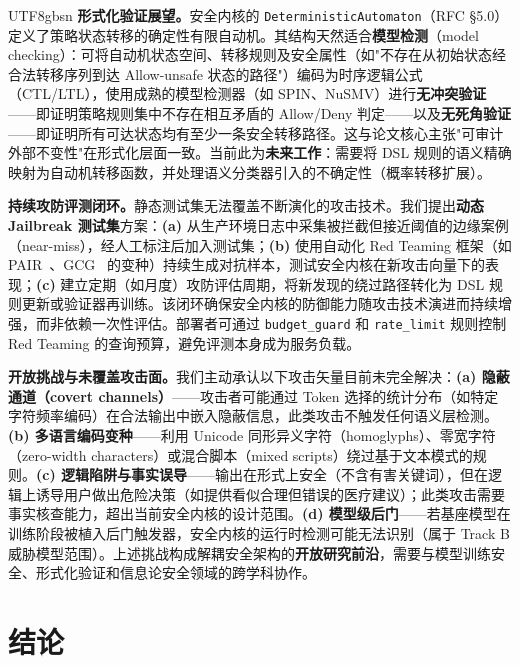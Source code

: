 \documentclass[letterpaper,twocolumn,10pt]{article}
\begin{document}
\begin{CJK}{UTF8}{gbsn}
\textbf{形式化验证展望。}安全内核的 \texttt{DeterministicAutomaton}（RFC \S 5.0）定义了策略状态转移的确定性有限自动机。其结构天然适合\textbf{模型检测}（model checking）：可将自动机状态空间、转移规则及安全属性（如"不存在从初始状态经合法转移序列到达 Allow-unsafe 状态的路径"）编码为时序逻辑公式（CTL/LTL），使用成熟的模型检测器（如 SPIN、NuSMV）进行\textbf{无冲突验证}——即证明策略规则集中不存在相互矛盾的 Allow/Deny 判定——以及\textbf{无死角验证}——即证明所有可达状态均有至少一条安全转移路径。这与论文核心主张"可审计外部不变性"在形式化层面一致。当前此为\textbf{未来工作}：需要将 DSL 规则的语义精确映射为自动机转移函数，并处理语义分类器引入的不确定性（概率转移扩展）。

\textbf{持续攻防评测闭环。}静态测试集无法覆盖不断演化的攻击技术。我们提出\textbf{动态 Jailbreak 测试集}方案：\textbf{(a)} 从生产环境日志中采集被拦截但接近阈值的边缘案例（near-miss），经人工标注后加入测试集；\textbf{(b)} 使用自动化 Red Teaming 框架（如 PAIR~\cite{pair-jailbreak}、GCG~\cite{gcg} 的变种）持续生成对抗样本，测试安全内核在新攻击向量下的表现；\textbf{(c)} 建立定期（如月度）攻防评估周期，将新发现的绕过路径转化为 DSL 规则更新或验证器再训练。该闭环确保安全内核的防御能力随攻击技术演进而持续增强，而非依赖一次性评估。部署者可通过 \texttt{budget\_guard} 和 \texttt{rate\_limit} 规则控制 Red Teaming 的查询预算，避免评测本身成为服务负载。

\textbf{开放挑战与未覆盖攻击面。}我们主动承认以下攻击矢量目前未完全解决：\textbf{(a) 隐蔽通道（covert channels）}——攻击者可能通过 Token 选择的统计分布（如特定字符频率编码）在合法输出中嵌入隐蔽信息，此类攻击不触发任何语义层检测。\textbf{(b) 多语言编码变种}——利用 Unicode 同形异义字符（homoglyphs）、零宽字符（zero-width characters）或混合脚本（mixed scripts）绕过基于文本模式的规则。\textbf{(c) 逻辑陷阱与事实误导}——输出在形式上安全（不含有害关键词），但在逻辑上诱导用户做出危险决策（如提供看似合理但错误的医疗建议）；此类攻击需要事实核查能力，超出当前安全内核的设计范围。\textbf{(d) 模型级后门}——若基座模型在训练阶段被植入后门触发器，安全内核的运行时检测可能无法识别（属于 Track B 威胁模型范围）。上述挑战构成解耦安全架构的\textbf{开放研究前沿}，需要与模型训练安全、形式化验证和信息论安全领域的跨学科协作。

\section{结论}


\end{CJK}
\end{document}
